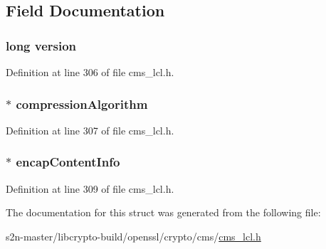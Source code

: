 \subsection{Field Documentation}
\subsubsection[{\texorpdfstring{version}{version}}]{\setlength{\rightskip}{0pt plus 5cm}long version}\hypertarget{struct_c_m_s___compressed_data__st_a17afc5cf84cee4b2123665f28ce85c9f}{}\label{struct_c_m_s___compressed_data__st_a17afc5cf84cee4b2123665f28ce85c9f}


Definition at line 306 of file cms\+\_\+lcl.\+h.

\subsubsection[{\texorpdfstring{compression\+Algorithm}{compressionAlgorithm}}]{$\ast$ compression\+Algorithm}\hypertarget{struct_c_m_s___compressed_data__st_a960a2cfb7ef1e4d56b2ae1922bebe89a}{}\label{struct_c_m_s___compressed_data__st_a960a2cfb7ef1e4d56b2ae1922bebe89a}


Definition at line 307 of file cms\+\_\+lcl.\+h.

\subsubsection[{\texorpdfstring{encap\+Content\+Info}{encapContentInfo}}]{$\ast$ encap\+Content\+Info}\hypertarget{struct_c_m_s___compressed_data__st_a436b5725775d32c6f9a979b8d5a4f8b5}{}\label{struct_c_m_s___compressed_data__st_a436b5725775d32c6f9a979b8d5a4f8b5}


Definition at line 309 of file cms\+\_\+lcl.\+h.



The documentation for this struct was generated from the following file\+:\begin{DoxyCompactItemize}
\item 
s2n-\/master/libcrypto-\/build/openssl/crypto/cms/\hyperlink{cms__lcl_8h}{cms\+\_\+lcl.\+h}\end{DoxyCompactItemize}
